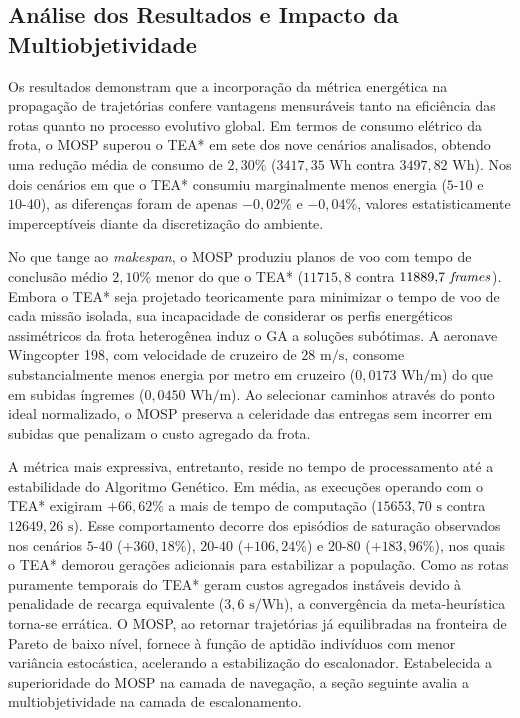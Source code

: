 \subsection*{Análise dos Resultados e Impacto da Multiobjetividade}

Os resultados demonstram que a incorporação da métrica energética na propagação de trajetórias confere vantagens mensuráveis tanto na eficiência das rotas quanto no processo evolutivo global. Em termos de consumo elétrico da frota, o MOSP superou o TEA* em sete dos nove cenários analisados, obtendo uma redução média de consumo de $2{,}30\%$ ($3417{,}35\text{ Wh}$ contra $3497{,}82\text{ Wh}$). Nos dois cenários em que o TEA* consumiu marginalmente menos energia ($5\text{-}10$ e $10\text{-}40$), as diferenças foram de apenas $-0{,}02\%$ e $-0{,}04\%$, valores estatisticamente imperceptíveis diante da discretização do ambiente.

No que tange ao \textit{makespan}, o MOSP produziu planos de voo com tempo de conclusão médio $2{,}10\%$ menor do que o TEA* ($11715{,}8$ contra $11889{,}7\text{ \textit{frames}}$). Embora o TEA* seja projetado teoricamente para minimizar o tempo de voo de cada missão isolada, sua incapacidade de considerar os perfis energéticos assimétricos da frota heterogênea induz o GA a soluções subótimas. A aeronave Wingcopter 198, com velocidade de cruzeiro de $28\text{ m/s}$, consome substancialmente menos energia por metro em cruzeiro ($0{,}0173\text{ Wh/m}$) do que em subidas íngremes ($0{,}0450\text{ Wh/m}$). Ao selecionar caminhos através do ponto ideal normalizado, o MOSP preserva a celeridade das entregas sem incorrer em subidas que penalizam o custo agregado da frota.

A métrica mais expressiva, entretanto, reside no tempo de processamento até a estabilidade do Algoritmo Genético. Em média, as execuções operando com o TEA* exigiram $+66{,}62\%$ a mais de tempo de computação ($15653{,}70\text{ s}$ contra $12649{,}26\text{ s}$). Esse comportamento decorre dos episódios de saturação observados nos cenários $5\text{-}40$ ($+360{,}18\%$), $20\text{-}40$ ($+106{,}24\%$) e $20\text{-}80$ ($+183{,}96\%$), nos quais o TEA* demorou gerações adicionais para estabilizar a população. Como as rotas puramente temporais do TEA* geram custos agregados instáveis devido à penalidade de recarga equivalente ($3{,}6\text{ s/Wh}$), a convergência da meta-heurística torna-se errática. O MOSP, ao retornar trajetórias já equilibradas na fronteira de Pareto de baixo nível, fornece à função de aptidão indivíduos com menor variância estocástica, acelerando a estabilização do escalonador. Estabelecida a superioridade do MOSP na camada de navegação, a seção seguinte avalia a multiobjetividade na camada de escalonamento.

